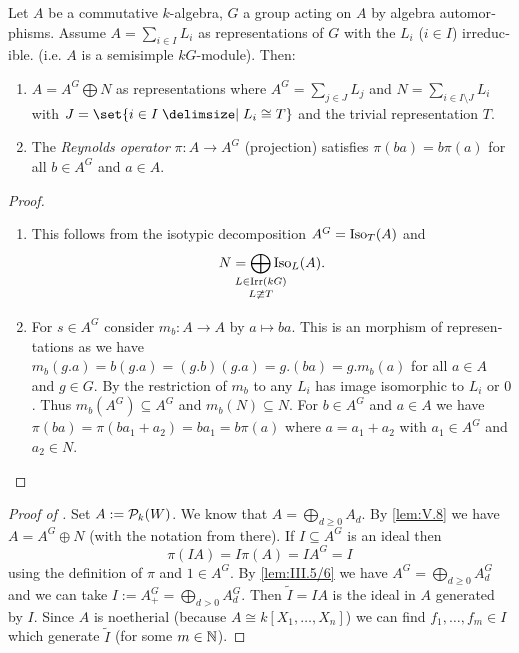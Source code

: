 \documentclass[12pt,a4paper]{scrartcl}
\theoremstyle{cplain}
\theoremstyle{cplain}
\theoremstyle{cplain}
\theoremstyle{definition}
\begin{document}
\begin{otherlanguage}{english}
\begin{lem} \label{lem:V.8} %
  Let $A$ be a commutative $k$-algebra, $G$ a group acting on $A$ by algebra automorphisms. Assume $A = \sum_{i\in I}L_i$ as representations of $G$ with the $L_i$ ($i\in I$) irreducible. (i.e. $A$ is a semisimple $kG$-module). Then:
  \begin{enumerate}
    \item $A = A^G \bigoplus N$ as representations where $A^G = \sum_{j\in J} L_j$ and $N = \sum_{i\in I\setminus J}L_i$ with $J = \set{i\in I\given L_i \cong T}$ and the trivial representation $T$. \label{lem:V.8:1}
    \item The \emph{Reynolds operator} $\pi\colon A \to A^G$ (projection) satisfies $\pi(ba) = b\pi(a)$ for all $b\in A^G$ and $a\in A$. \label{lem:V.8:2}
  \end{enumerate}
\end{lem}
\begin{proof}
  \leavevmode
  \begin{enumerate}[label=\ref{lem:V.8:\arabic*}]
    \item This follows from the isotypic decomposition $A^G = \operatorname{Iso}_T(A)$ and \[N= \bigoplus_{\mathclap{\substack{L\in\Irr(kG)\\ L\ncong T}}}\Iso_L(A).\]
    \item For $s \in A^G$ consider $m_b\colon A \to A$ by $a \mapsto ba$. This is an morphism of representations as we have $m_b(g.a) = b(g.a) = (g.b)(g.a) = g.(ba) = g.m_b(a)$ for all $a \in A$ and $g\in G$. By  the restriction of $m_b$ to any $L_i$ has image isomorphic to $L_i$ or $0$. Thus $m_b(A^G) \subseteq A^G$ and $m_b(N) \subseteq N$. For $b\in A^G$ and $a \in A$ we have $\pi(ba) = \pi(ba_1+a_2) = ba_1 = b\pi(a)$ where $a = a_1+a_2$ with $a_1 \in A^G$ and $a_2 \in N$.
    \qedhere
  \end{enumerate}
\end{proof}

\begin{proof}[Proof of ]
  Set $A := \mathcal{P}_k(W)$. We know that $A = \bigoplus_{d\ge 0}A_d$. By \cref{lem:V.8} we have $A = A^G \oplus N$ (with the notation from there). If $I \subseteq A^G$ is an ideal then
  \begin{equation}
    \pi(IA) = I\pi(A) = IA^G = I \tag{*}\label{eq:thm:hilbert}
  \end{equation}
  using the definition of $\pi$ and $1\in A^G$. By \cref{lem:III.5/6} we have $A^G = \bigoplus_{d\ge0}A_d^G$ and we can take $I := A^G_+ = \bigoplus_{d>0}A_d^G$. Then $\tilde I = IA$ is the ideal in $A$ generated by $I$. Since $A$ is noetherial (because $A \cong k[X_1,\ldots,X_n]$) we can find $f_1,\ldots,f_m\in I$ which generate $\tilde I$ (for some $m\in\mathbb N$).
  

\end{proof}
\end{otherlanguage}
\end{document}
